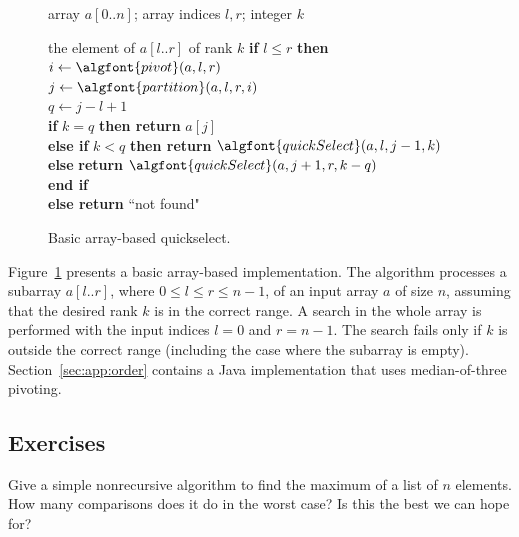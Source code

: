 \begin{figure}[htb!]
\hspace*{.5in}\begin{minipage}{5in}
{
\begin{minipage}[t]{5in}
array $a[0..n]$; array indices $l, r$; integer $k$\\
\end{minipage}
}
{the element of $a[l..r]$ of rank $k$}
{
\> \textbf{if} $l \leq r$ \textbf{then} \\
\> \> $i \leftarrow \algfont{pivot}(a,l,r)$ \\
\> \> $j \leftarrow \algfont{partition}(a,l,r,i)$ \\
\> \> $q \leftarrow j - l + 1$ \\
\> \> \textbf{if} $k = q$ \textbf{then return} $a[j]$\\
\> \> \textbf{else if} $ k < q$ \textbf{then return} $\algfont{quickSelect}(a, l, j - 1, k)$ %
\\  
\> \> \textbf{else} \textbf{return} $\algfont{quickSelect}(a, j+1, r, k-q)$ 
\\
\> \textbf{end if}\\
\> \textbf{else return} ``not found"\\
}
\end{minipage}
\caption{\label{fig:quickselect} Basic array-based quickselect.}
\end{figure} 


Figure~\ref{fig:quickselect} presents a basic array-based implementation. 
The algorithm processes a subarray
$a[l..r]$, where $0 \le l \le r \le n-1$, of an input array
$a$ of size $n$, assuming that the desired rank $k$ is
in the correct range. A search in the whole array is performed
with the input indices $l=0$ and $r=n-1$. The 
search fails only if $k$ is outside the correct range (including the case where 
the subarray is empty).
Section~\ref{sec:app:order} contains a Java implementation that uses median-of-three
pivoting.

\subsection*{Exercises}

\begin{Exercise}\label{exr:selectmax}
Give a simple nonrecursive algorithm to find the maximum of a list of $n$ 
elements. How many comparisons does it do in the worst case? 
Is this the best we can hope for?
\end{Exercise}

